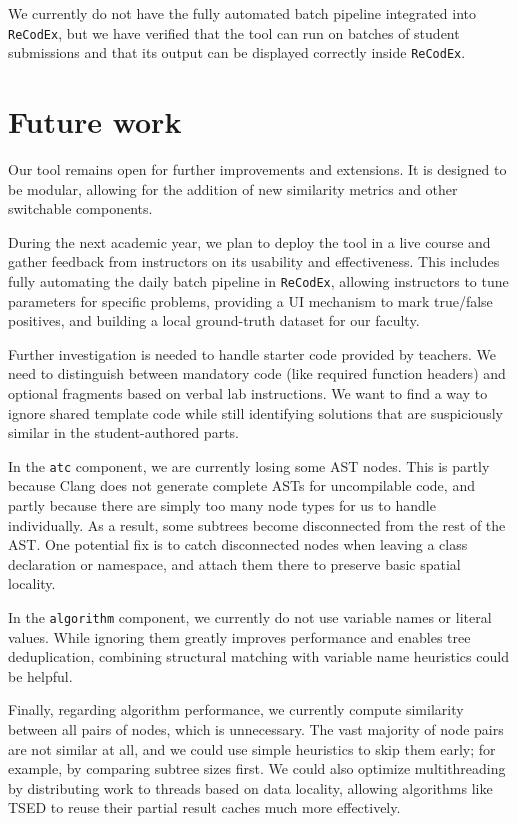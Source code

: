 We currently do not have the fully automated batch pipeline integrated into \texttt{ReCodEx}, but we have verified that the tool can run on batches of student submissions and that its output can be displayed correctly inside \texttt{ReCodEx}.

\section*{Future work}
{}
\label{sec:name:future}

Our tool remains open for further improvements and extensions.
It is designed to be modular, allowing for the addition of new similarity metrics and other switchable components.

During the next academic year, we plan to deploy the tool in a live course and gather feedback from instructors on its usability and effectiveness.
This includes fully automating the daily batch pipeline in \texttt{ReCodEx}, allowing instructors to tune parameters for specific problems, providing a UI mechanism to mark true/false positives, and building a local ground-truth dataset for our faculty.

Further investigation is needed to handle starter code provided by teachers.
We need to distinguish between mandatory code (like required function headers) and optional fragments based on verbal lab instructions.
We want to find a way to ignore shared template code while still identifying solutions that are suspiciously similar in the student-authored parts.

In the \texttt{atc} component, we are currently losing some AST nodes.
This is partly because Clang does not generate complete ASTs for uncompilable code, and partly because there are simply too many node types for us to handle individually.
As a result, some subtrees become disconnected from the rest of the AST.
One potential fix is to catch disconnected nodes when leaving a class declaration or namespace, and attach them there to preserve basic spatial locality.

In the \texttt{algorithm} component, we currently do not use variable names or literal values.
While ignoring them greatly improves performance and enables tree deduplication, combining structural matching with variable name heuristics could be helpful.

Finally, regarding algorithm performance, we currently compute similarity between all pairs of nodes, which is unnecessary.
The vast majority of node pairs are not similar at all, and we could use simple heuristics to skip them early; for example, by comparing subtree sizes first.
We could also optimize multithreading by distributing work to threads based on data locality, allowing algorithms like TSED to reuse their partial result caches much more effectively.
